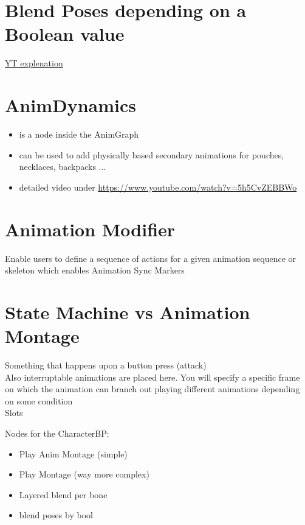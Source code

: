     \section{Blend Poses depending on a Boolean value}
        \href{https://www.youtube.com/watch?v=TiQjjcvM7Eo}{YT explenation}
    

    \section{AnimDynamics}
        \begin{itemize}
            \item is a node inside the AnimGraph
            \item can be used to add physically based secondary animations for pouches, necklaces, backpacks ...
            \item detailed video under \href{https://www.youtube.com/watch?v=5h5CvZEBBWo}{https://www.youtube.com/watch?v=5h5CvZEBBWo}
        \end{itemize}


    \section{Animation Modifier}
        Enable users to define a sequence of actions for a given animation sequence or skeleton which enables Animation Sync Markers


    \section{State Machine vs Animation Montage}
        Something that happens upon a button press (attack) \\
        Also interruptable animations are placed here. You will specify a specific frame on which the animation can
        branch out playing different animations depending on some condition \\
        Slots 

        Nodes for the CharacterBP:
        \begin{itemize}
            \item Play Anim Montage (simple)
            \item Play Montage (way more complex)
            \item Layered blend per bone
            \item blend poses by bool
        \end{itemize}
    \smallskip


